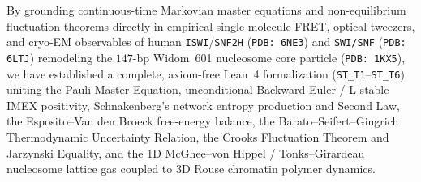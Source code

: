 \documentclass[11pt,a4paper]{article}
\theoremstyle{definition}
\begin{document}
By grounding continuous-time Markovian master equations and non-equilibrium fluctuation theorems directly in empirical single-molecule FRET, optical-tweezers, and cryo-EM observables of human \texttt{ISWI}/\texttt{SNF2H} (\texttt{PDB: 6NE3}) and \texttt{SWI/SNF} (\texttt{PDB: 6LTJ}) remodeling the $147\text{-bp}$ Widom~601 nucleosome core particle (\texttt{PDB: 1KX5}), we have established a complete, axiom-free Lean~4 formalization (\texttt{ST\_T1}--\texttt{ST\_T6}) uniting the Pauli Master Equation, unconditional Backward-Euler / L-stable IMEX positivity, Schnakenberg's network entropy production and Second Law, the Esposito--Van den Broeck free-energy balance, the Barato--Seifert--Gingrich Thermodynamic Uncertainty Relation, the Crooks Fluctuation Theorem and Jarzynski Equality, and the 1D McGhee--von Hippel / Tonks--Girardeau nucleosome lattice gas coupled to 3D Rouse chromatin polymer dynamics.
\end{document}
